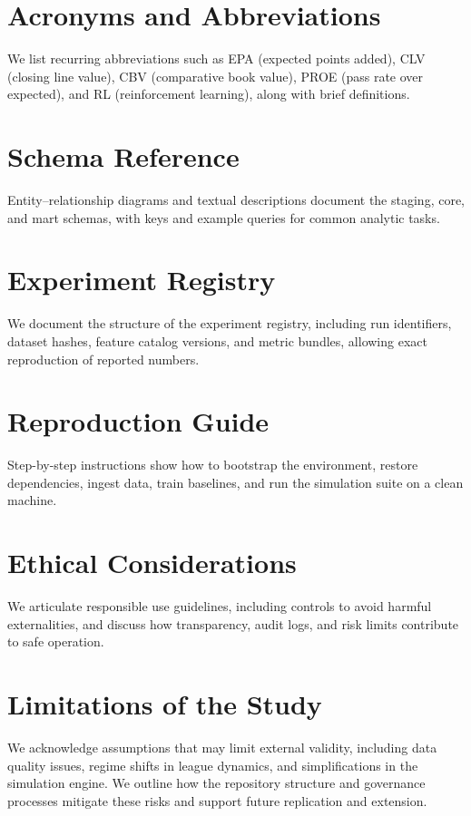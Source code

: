 \documentclass[12pt]{report}  %
\numberwithin{equation}{section}
\theoremstyle{plain}
\theoremstyle{definition}
\theoremstyle{remark}
\begin{document}
\section{Acronyms and Abbreviations}
We list recurring abbreviations such as EPA (expected points added), CLV (closing line value), CBV (comparative book value), PROE (pass rate over expected), and RL (reinforcement learning), along with brief definitions.

\section{Schema Reference}
Entity--relationship diagrams and textual descriptions document the staging, core, and mart schemas, with keys and example queries for common analytic tasks.

\section{Experiment Registry}
We document the structure of the experiment registry, including run identifiers, dataset hashes, feature catalog versions, and metric bundles, allowing exact reproduction of reported numbers.

\section{Reproduction Guide}
Step-by-step instructions show how to bootstrap the environment, restore dependencies, ingest data, train baselines, and run the simulation suite on a clean machine.

\section{Ethical Considerations}
We articulate responsible use guidelines, including controls to avoid harmful externalities, and discuss how transparency, audit logs, and risk limits contribute to safe operation.

\section{Limitations of the Study}
We acknowledge assumptions that may limit external validity, including data quality issues, regime shifts in league dynamics, and simplifications in the simulation engine. We outline how the repository structure and governance processes mitigate these risks and support future replication and extension.
\end{document}
